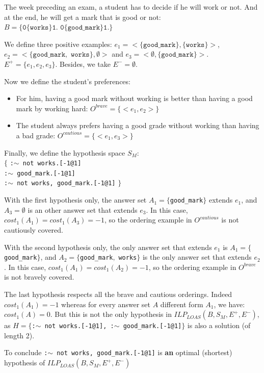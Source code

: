 \begin{example}
The week preceding an exam, a student has to decide if he will work or not. And at the end, he will get a mark that is good or not: $B=\{\texttt{0\{works\}1. 
0\{good\_mark\}1.}\}$

\bigskip

We define three positive examples: $e_1 = <\{\texttt{good\_mark}\},\{\texttt{works}\}>$, $e_2 = <\{\texttt{good\_mark},\texttt{ works}\},\emptyset>$ and $e_3 = <\emptyset,\{\texttt{good\_mark}\}>$. $E^+=\{e_1, e_2, e_3\}$. Besides, we take $E^-=\emptyset$.

\bigskip

Now we define the student's preferences:
\begin{itemize}
\item For him, having a good mark without working is better than having a good mark by working hard: $O^{brave}=\{<e_1,e_2>\}$
\item The student always prefers having a good grade without working than having a bad grade: $O^{cautious}=\{<e_1,e_3>\}$
\end{itemize}

Finally, we define the hypothesis space $S_M$:\\
$\{$ \texttt{:$\sim$ not works.[-1@1]\\
:$\sim$ good\_mark.[-1@1]\\
:$\sim$ not works, good\_mark.[-1@1]} $\}$\\

\bigskip

With the first hypothesis only, the answer set $A_1=\{$\texttt{good\_mark}$\}$ extends $e_1$, and $A_3=\emptyset$ is an other answer set that extends $e_3$. In this case, $cost_1(A_1)=cost_1(A_3)=-1$, so the ordering example in $O^{cautious}$ is not cautiously covered.

\bigskip

With the second hypothesis only, the only answer set that extends $e_1$ is $A_1=\{$\texttt{good\_mark}$\}$, and $A_2=\{$\texttt{good\_mark}$,$ \texttt{works}$\}$ is the only answer set that extends $e_2$. In this case, $cost_1(A_1)=cost_1(A_2)=-1$, so the ordering example in $O^{brave}$ is not bravely covered.

\bigskip

The last hypothesis respects all the brave and cautious orderings. Indeed $cost_1(A_1)=-1$ whereas for every answer set $A$ different form $A_1$, we have: $cost_1(A)=0$. But this is not the only hypothesis in $ILP_{LOAS}(B,S_M,E^+,E^-)$, as $H=\{$\texttt{:$\sim$ not works.[-1@1], :$\sim$ good\_mark.[-1@1]}$\}$ is also a solution (of length 2).

\bigskip

To conclude \texttt{:$\sim$ not works, good\_mark.[-1@1]} is \textbf{an} optimal (shortest) hypothesis of  $ILP_{LOAS}(B,S_M,E^+,E^-)$

\end{example}

